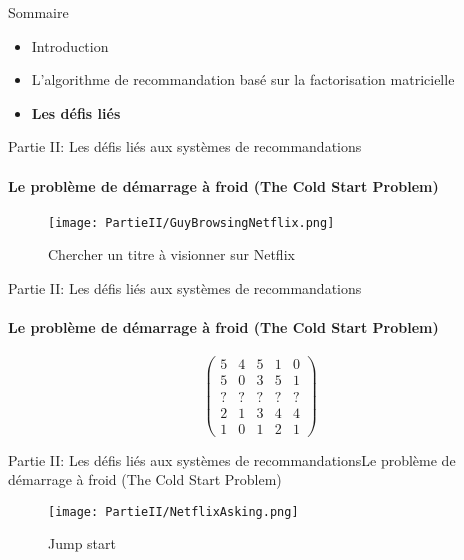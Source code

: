 \newcommand{\PartieII}{Partie II: Les défis liés aux systèmes de recommandations}
\newcommand{\ColdStart}{Le problème de démarrage à froid (The Cold Start Problem)}
\newcommand{\Bias}{Les biais liées aux systèmes de recommandations}

\begin{frame}{Sommaire}
    \begin{itemize}
        \item Introduction
        \item L'algorithme de recommandation basé sur la factorisation matricielle
        \item \textbf{Les défis liés}
    \end{itemize}
\end{frame}

\begin{frame}{\PartieII}
    \framesubtitle{\ColdStart}

    \begin{figure}
        \centering
        \texttt{[image: PartieII/GuyBrowsingNetflix.png]}
        \caption{Chercher un titre à visionner sur Netflix}
    \end{figure}

\end{frame}

\begin{frame}{\PartieII}
    \framesubtitle{\ColdStart}

    \begin{figure}
        \[
            \begin{pmatrix}
                5 & 4 & 5 & 1 & 0 \\
                5 & 0 & 3 & 5 & 1 \\
                ? & ? & ? & ? & ? \\
                2 & 1 & 3 & 4 & 4 \\
                1 & 0 & 1 & 2 & 1
            \end{pmatrix}
        \]

    \end{figure}

\end{frame}

\begin{frame}{\PartieII}{\ColdStart}

    \begin{figure}
        \centering
        \texttt{[image: PartieII/NetflixAsking.png]}
        \caption{Jump start}
    \end{figure}

\end{frame}


